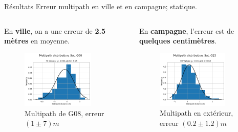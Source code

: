 \documentclass[xcolor=dvipsnames,envcountsect]{beamer}
\begin{document}
\begin{frame}{Résultats}
	Erreur multipath en ville et en campagne; statique.
	\newline
	\begin{columns}
		\begin{column}{0.5\textwidth}
			{\small En \textbf{ville}, on a une erreur de \textbf{2.5 mètres} en moyenne.}
			\begin{figure}
				\centering
				\includegraphics[width=0.8\textwidth]{./Figures/MP_G08_dis.png}
				\caption {Multipath de G08, erreur $(1 \pm 7)m$}
			\end{figure}
		\end{column}

		\begin{column}{0.5\textwidth}
			{\small En \textbf{campagne}, l'erreur est de \textbf{quelques centimètres}.}
			\begin{figure}
				\centering
				\includegraphics[width=0.8\textwidth]{./Figures/MP_G25_dis_camp.png}
				\caption {Multipath en extérieur, erreur $(0.2 \pm 1.2)m$}
			\end{figure}
		\end{column}
	\end{columns}
\end{frame}
\end{document}
